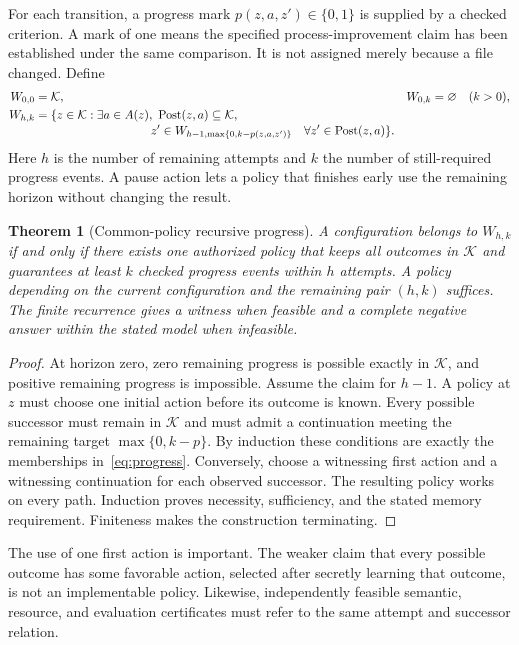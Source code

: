 \documentclass[11pt,letterpaper]{article}
\theoremstyle{plain}
\newtheorem{theorem}{Theorem}[section]
\theoremstyle{definition}
\begin{document}
For each transition, a progress mark $p(z,a,z')\in\{0,1\}$ is supplied by a checked criterion. A mark of one means the specified process-improvement claim has been established under the same comparison. It is not assigned merely because a file changed. Define
\begin{align}\label{eq:progress}
W_{0,0}&=\mathcal K, & W_{0,k}&=\varnothing\quad(k>0),\\
W_{h,k}&=\{z\in\mathcal K:\exists a\in A(z),\ \Post(z,a)\subseteq\mathcal K,\nonumber\\[-2pt]
&\hspace{34mm} z'\in W_{h-1,\max\{0,k-p(z,a,z')\}}
\quad\forall z'\in\Post(z,a)\}.\nonumber
\end{align}
Here $h$ is the number of remaining attempts and $k$ the number of still-required progress events. A pause action lets a policy that finishes early use the remaining horizon without changing the result.

\begin{theorem}[Common-policy recursive progress]\label{thm:progress}
A configuration belongs to $W_{h,k}$ if and only if there exists one authorized policy that keeps all outcomes in $\mathcal K$ and guarantees at least $k$ checked progress events within $h$ attempts. A policy depending on the current configuration and the remaining pair $(h,k)$ suffices. The finite recurrence gives a witness when feasible and a complete negative answer within the stated model when infeasible.
\end{theorem}
\begin{proof}
At horizon zero, zero remaining progress is possible exactly in $\mathcal K$, and positive remaining progress is impossible. Assume the claim for $h-1$. A policy at $z$ must choose one initial action before its outcome is known. Every possible successor must remain in $\mathcal K$ and must admit a continuation meeting the remaining target $\max\{0,k-p\}$. By induction these conditions are exactly the memberships in~\eqref{eq:progress}. Conversely, choose a witnessing first action and a witnessing continuation for each observed successor. The resulting policy works on every path. Induction proves necessity, sufficiency, and the stated memory requirement. Finiteness makes the construction terminating.
\end{proof}

The use of one first action is important. The weaker claim that every possible outcome has some favorable action, selected after secretly learning that outcome, is not an implementable policy. Likewise, independently feasible semantic, resource, and evaluation certificates must refer to the same attempt and successor relation.
\end{document}
